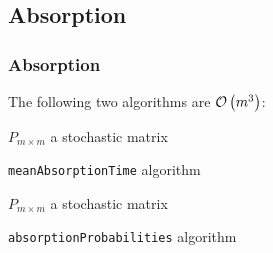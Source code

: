 \subsection{Absorption}
 \begin{frame}\frametitle{Absorption}
    \vspace{3em}
    The following two algorithms are \(\mathcal{O}\left(m^3\right)\):
    \vspace{-1em}
    \begin{algorithm}[H]
    \begin{algorithmic}[1]
    \REQUIRE $P_{m \times m}$ a stochastic matrix
    \NEWLINE
    \caption{\texttt{meanAbsorptionTime} algorithm}
    \label{alg:meanAbsorptionTime}
    \end{algorithmic}
    \end{algorithm}

    \vspace{-2em}
    
    \begin{algorithm}[H]
    \begin{algorithmic}[1]
    \REQUIRE $P_{m \times m}$ a stochastic matrix
    \NEWLINE
    \caption{\texttt{absorptionProbabilities} algorithm}
    \label{alg:absorptionProbabilities}
    \end{algorithmic}
    \end{algorithm}
    
\end{frame}
